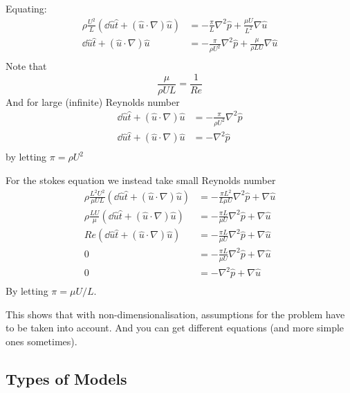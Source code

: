 \documentclass{X:/Documents/Coding/Latex/myassignment}
\begin{document}
Equating:
\begin{align*}
	\rho \frac{U^2}{L}\left( \dd{\hat{u}}{\hat{t}} +(\hat{u}\cdot \nabla) \hat{u}\right) &=-\frac{\pi}{L} \nabla^2 \hat{p} + \frac{\mu U}{L^2} \nabla \hat{u}\\
	\dd{\hat{u}}{\hat{t}} +(\hat{u}\cdot \nabla) \hat{u} &=-\frac{\pi}{\rho U^2} \nabla^2 \hat{p} + \frac{\mu }{\rho L U} \nabla \hat{u}\\
\end{align*}
Note that
\[\frac{\mu}{\rho UL} = \frac{1}{Re}\]
And for large (infinite) Reynolds number
\begin{align*}
	\dd{\hat{u}}{\hat{t}} +(\hat{u}\cdot \nabla) \hat{u} &=-\frac{\pi}{\rho U^2} \nabla^2 \hat{p}\\
	\dd{\hat{u}}{\hat{t}} +(\hat{u}\cdot \nabla) \hat{u} &=- \nabla^2 \hat{p}\\
\end{align*}
by letting $\pi = \rho U^2$

For the stokes equation we instead take small Reynolds number
\begin{align*}
	\rho \frac{L^2U^2}{\mu UL}\left( \dd{\hat{u}}{\hat{t}} +(\hat{u}\cdot \nabla) \hat{u}\right) &=-\frac{\pi L^2}{L\mu U} \nabla^2 \hat{p} + \nabla \hat{u}\\
	\rho \frac{LU}{\mu }\left( \dd{\hat{u}}{\hat{t}} +(\hat{u}\cdot \nabla) \hat{u}\right) &=-\frac{\pi L}{\mu U} \nabla^2 \hat{p} + \nabla \hat{u}\\
	Re\left( \dd{\hat{u}}{\hat{t}} +(\hat{u}\cdot \nabla) \hat{u}\right) &=-\frac{\pi L}{\mu U} \nabla^2 \hat{p} + \nabla \hat{u}\\
	0 &=-\frac{\pi L}{\mu U} \nabla^2 \hat{p} + \nabla \hat{u}\\
	0 &=-\nabla^2 \hat{p} + \nabla \hat{u}\\
\end{align*}
By letting $\pi = \mu U/L$.

This shows that with non-dimensionalisation, assumptions for the problem have to be taken into account. And you can get different equations (and more simple ones sometimes).







\subsection{Types of Models}
\end{document}

